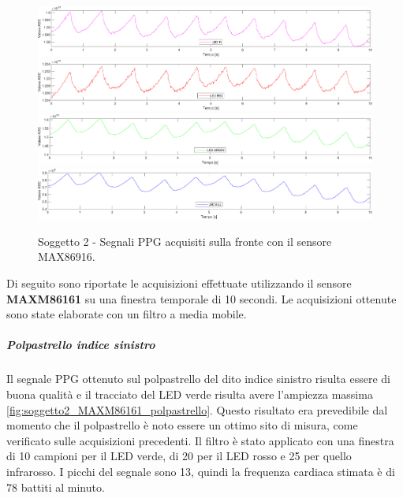 \begin{figure}[h]
	\centering
	\includegraphics[width=1\linewidth]{ImageFiles/Misure Preliminari/Soggetto 2/max86916/fronte_ired}
	\includegraphics[width=1\linewidth]{ImageFiles/Misure Preliminari/Soggetto 2/max86916/fronte_red}
	\includegraphics[width=1\linewidth]{ImageFiles/Misure Preliminari/Soggetto 2/max86916/fronte_green}
	\includegraphics[width=1\linewidth]{ImageFiles/Misure Preliminari/Soggetto 2/max86916/fronte_blu}
	\caption{Soggetto 2 - Segnali PPG acquisiti sulla fronte con il sensore MAX86916.}
	\label{fig:soggetto2_MAX86916_fronte}
\end{figure}

\clearpage

Di seguito sono riportate le acquisizioni effettuate utilizzando il sensore \textbf{MAXM86161} su una finestra temporale di 10 secondi. Le acquisizioni ottenute sono state elaborate con un filtro a media mobile.

\subparagraph{Polpastrello indice sinistro}
Il segnale PPG ottenuto sul polpastrello del dito indice sinistro risulta essere di buona qualità e il tracciato del LED verde risulta avere l'ampiezza massima \ref{fig:soggetto2_MAXM86161_polpastrello}. Questo risultato era prevedibile dal momento che il polpastrello è noto essere un ottimo sito di misura, come verificato sulle acquisizioni precedenti. Il filtro è stato applicato con una finestra di 10 campioni per il LED verde, di 20 per il LED rosso e 25 per quello infrarosso. I picchi del segnale sono 13, quindi la frequenza cardiaca stimata è di 78 battiti al minuto.

